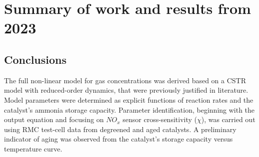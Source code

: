 \section{Summary of work and results from 2023}








\subsection{Conclusions}
The full non-linear model for gas concentrations was derived based on a CSTR
model with reduced-order dynamics, that were previously justified in
literature. Model parameters were determined as explicit functions of reaction
rates and the catalyst's ammonia storage capacity.  Parameter identification,
beginning with the output equation and focusing on $NO_x$ sensor
cross-sensitivity ($\chi$), was carried out using RMC test-cell data from
degreened and aged catalysts. A preliminary indicator of aging was observed
from the catalyst's storage capacity versus temperature curve.
